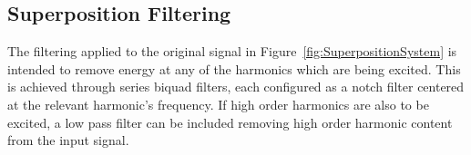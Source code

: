 \begin{appendices}
	\section{Superposition Filtering}
		The filtering applied to the original signal in Figure~\ref{fig:SuperpositionSystem} is intended to remove
		energy at any of the harmonics which are being excited. This is achieved through series biquad filters, each
		configured as a notch filter centered at the relevant harmonic's frequency. If high order harmonics are also
		to be excited, a low pass filter can be included removing high order harmonic content from the input signal.

\end{appendices}
